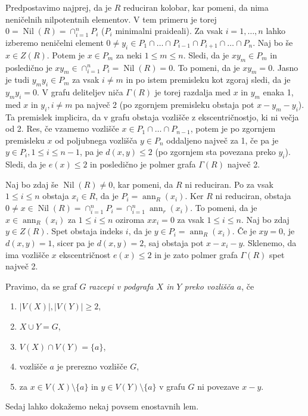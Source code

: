 \documentclass[a4paper, 12pt]{amsart}
\theoremstyle{definition} %
\theoremstyle{plain} %
\DeclareMathOperator{\ann}{ann}
\DeclareMathOperator{\nil}{Nil}
\begin{document}
Predpostavimo najprej, da je $R$ reduciran kolobar, kar pomeni, da nima neničelnih nilpotentnih elementov. V tem primeru je torej $0=\nil(R)=\cap_{i=1}^n P_i$ ($P_i$ minimalni praideali). Za vsak $i=1,\dots,n$ lahko izberemo neničelni element $0\neq y_i\in P_1 \cap\dots \cap P_{i-1}\cap P_{i+1}\cap\dots \cap P_n$. Naj bo še $x\in Z(R)$. Potem je $x\in P_m$ za neki $1\le m \le n$. Sledi, da je $xy_m\in P_m$ in posledično je $xy_m \in \cap_{i=1}^n P_i = \nil(R) = 0$. To pomeni, da je $xy_m = 0$. Jasno je tudi $y_m y_i\in P_m$ za vsak $i\neq m$ in po istem premisleku kot zgoraj sledi, da je $y_m y_i = 0$. V grafu deliteljev niča $\Gamma(R)$ je torej razdalja med $x$ in $y_m$ enaka 1, med $x$ in $y_i, i\neq m$ pa največ 2 (po zgornjem premisleku obstaja pot $x-y_m-y_i$). Ta premislek implicira, da v grafu obstaja vozlišče z ekscentričnostjo, ki ni večja od 2. Res, če vzamemo vozlišče $x\in P_1\cap \dots \cap P_{n-1}$, potem je po zgornjem premisleku $x$ od poljubnega vozlišča $y \in P_n$ oddaljeno največ za 1, če pa je $y\in P_i, 1 \le i \le n-1$, pa je $d(x,y) \le 2$ (po zgornjem sta povezana preko $y_i$). Sledi, da je $e(x) \le 2$ in posledično je polmer grafa $\Gamma(R)$ največ 2.

Naj bo zdaj še $\nil(R)\neq 0$, kar pomeni, da $R$ ni reduciran. Po \cite[Izrek 86]{Kaplansky} za vsak $1\le i \le n$ obstaja $x_i \in R$, da je $P_i = \ann_R(x_i)$. Ker $R$ ni reduciran, obstaja $0\neq x \in \nil(R) = \cap_{i=1}^n P_i = \cap_{i=1}^n \ann_r(x_i)$. To pomeni, da je $x\in \ann_R(x_i)$ za $ 1\le i \le n$ oziroma $x x_i = 0$ za vsak $1\le i \le n$. Naj bo zdaj $y\in Z(R)$. Spet obstaja indeks $i$, da je $y\in P_i = \ann_R(x_i)$. Če je $xy =0$, je $d(x,y)=1$, sicer pa je $d(x,y) = 2$, saj obstaja pot $x - x_i - y$. Sklenemo, da ima vozlišče $x$ ekscentričnost $e(x) \le 2$ in je  zato polmer grafa $\Gamma(R)$ spet največ 2.

\endproof

Pravimo, da se graf $G$ \emph{razcepi v podgrafa $X$ in $Y$ preko vozlišča $a$}, če 
\begin{enumerate}
\item $|V(X)|,|V(Y)| \ge 2$,
\item $X\cup Y = G$,
\item $V(X) \cap V(Y) = \{a\}$,
\item vozlišče $a$ je prerezno vozlišče $G$,
\item za $x\in V(X)\setminus\{a\}$ in $y\in V(Y) \setminus \{a\}$ v grafu $G$ ni povezave $x-y$.
\end{enumerate}
Sedaj lahko dokažemo nekaj povsem enostavnih lem.
\end{document}
